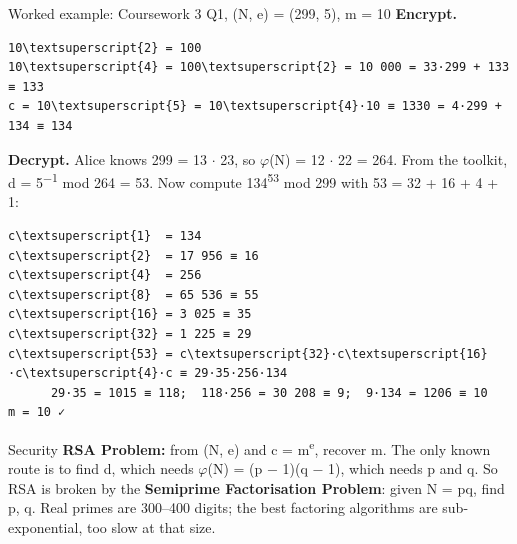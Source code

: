 \documentclass[11pt,a4paper]{article}
\begin{document}
\begin{example}{Worked example: Coursework 3 Q1, (N, e) = (299, 5), m = 10}
\textbf{Encrypt.}\par
\begin{workbox}
\begin{Verbatim}[commandchars=\\\{\},fontsize=\footnotesize]
10\textsuperscript{2} = 100
10\textsuperscript{4} = 100\textsuperscript{2} = 10 000 = 33·299 + 133 ≡ 133
c = 10\textsuperscript{5} = 10\textsuperscript{4}·10 ≡ 1330 = 4·299 + 134 ≡ 134
\end{Verbatim}
\end{workbox}
\textbf{Decrypt.} Alice knows 299 = 13 \ensuremath{\cdot} 23, so \ensuremath{\varphi}(N) = 12 \ensuremath{\cdot} 22 = 264. From the toolkit, d = 5\textsuperscript{\ensuremath{-}1} mod 264 = 53. Now compute 134\textsuperscript{53} mod 299 with 53 = 32 + 16 + 4 + 1:\par
\begin{workbox}
\begin{Verbatim}[commandchars=\\\{\},fontsize=\footnotesize]
c\textsuperscript{1}  = 134
c\textsuperscript{2}  = 17 956 ≡ 16
c\textsuperscript{4}  = 256
c\textsuperscript{8}  = 65 536 ≡ 55
c\textsuperscript{16} = 3 025 ≡ 35
c\textsuperscript{32} = 1 225 ≡ 29
c\textsuperscript{53} = c\textsuperscript{32}·c\textsuperscript{16}·c\textsuperscript{4}·c ≡ 29·35·256·134
      29·35 = 1015 ≡ 118;  118·256 = 30 208 ≡ 9;  9·134 = 1206 ≡ 10
m = 10 ✓
\end{Verbatim}
\end{workbox}
\end{example}
\begin{concept}{Security}
\textbf{RSA Problem:} from (N, e) and c = m\textsuperscript{e}, recover m. The only known route is to find d, which needs \ensuremath{\varphi}(N) = (p \ensuremath{-} 1)(q \ensuremath{-} 1), which needs p and q. So RSA is broken by the \textbf{Semiprime Factorisation Problem}: given N = pq, find p, q. Real primes are 300–400 digits; the best factoring algorithms are sub-exponential, too slow at that size.\par
\end{concept}
\end{document}

